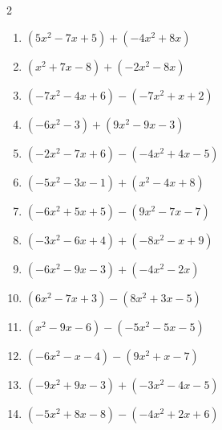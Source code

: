 \begin{multicols}{2}
\begin{enumerate}

  \item $(5x^{2}-7x+5)+(-4x^{2}+8x)$


  \item $(x^{2}+7x-8)+(-2x^{2}-8x)$


  \item $(-7x^{2}-4x+6)-(-7x^{2}+x+2)$

        \phantom{$=-5x+4$}

  \item $(-6x^{2}-3)+(9x^{2}-9x-3)$


  \item $(-2x^{2}-7x+6)-(-4x^{2}+4x-5)$


  \item $(-5x^{2}-3x-1)+(x^{2}-4x+8)$


  \item $(-6x^{2}+5x+5)-(9x^{2}-7x-7)$


  \item $(-3x^{2}-6x+4)+(-8x^{2}-x+9)$


  \item $(-6x^{2}-9x-3)+(-4x^{2}-2x)$


  \item $(6x^{2}-7x+3)-(8x^{2}+3x-5)$


  \item $(x^{2}-9x-6)-(-5x^{2}-5x-5)$


  \item $(-6x^{2}-x-4)-(9x^{2}+x-7)$


  \item $(-9x^{2}+9x-3)+(-3x^{2}-4x-5)$


  \item $(-5x^{2}+8x-8)-(-4x^{2}+2x+6)$


\end{enumerate}
\end{multicols}
